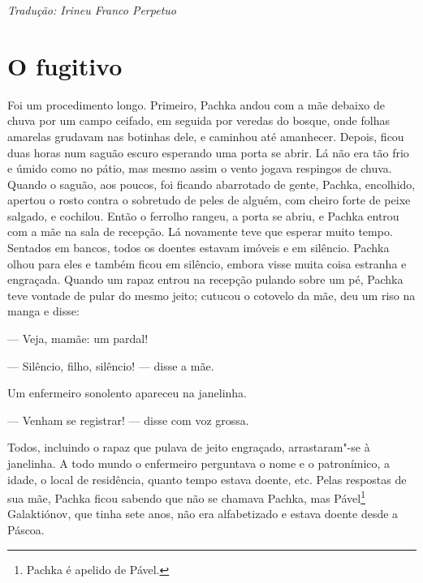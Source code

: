 

\medskip

{\footnotesize\hfill\emph{Tradução: Irineu Franco Perpetuo}}

\chapter{O fugitivo}\label{part7} \label{part7}

Foi um procedimento longo. Primeiro, Pachka andou com a mãe debaixo de
chuva por um campo ceifado, em seguida por veredas do bosque, onde
folhas amarelas grudavam nas botinhas dele, e caminhou até amanhecer.
Depois, ficou duas horas num saguão escuro esperando uma porta se abrir. Lá não era tão frio e úmido como no pátio, mas mesmo assim o vento
jogava respingos de chuva. Quando o saguão, aos poucos, foi ficando
abarrotado de gente, Pachka, encolhido, apertou o rosto contra o
sobretudo de peles de alguém, com cheiro forte de peixe salgado, e
cochilou. Então o ferrolho rangeu, a porta se abriu, e Pachka entrou com
a mãe na sala de recepção. Lá novamente teve que esperar muito tempo.
Sentados em bancos, todos os doentes estavam imóveis e em silêncio.
Pachka olhou para eles e também ficou em silêncio, embora visse muita
coisa estranha e engraçada. Quando um rapaz entrou na recepção pulando
sobre um pé, Pachka teve vontade de pular do mesmo jeito; cutucou o
cotovelo da mãe, deu um riso na manga e disse:

--- Veja, mamãe: um pardal!

--- Silêncio, filho, silêncio! --- disse a mãe.

Um enfermeiro sonolento apareceu na janelinha.

--- Venham se registrar! --- disse com voz grossa.

Todos, incluindo o rapaz que pulava de jeito engraçado, arrastaram"-se à
janelinha. A todo mundo o enfermeiro perguntava o nome e o patronímico,
a idade, o local de residência, quanto tempo estava doente, etc. Pelas
respostas de sua mãe, Pachka ficou sabendo que não se chamava Pachka,
mas Pável\footnote{Pachka é apelido de Pável.} Galaktiónov, que tinha
sete anos, não era alfabetizado e estava doente desde a Páscoa.

